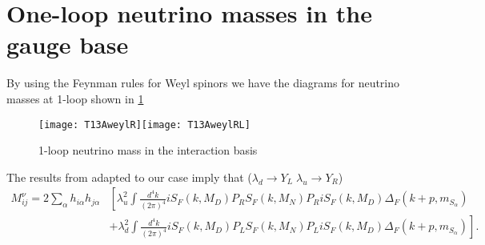 \section{One-loop neutrino masses in the gauge base}
\label{sec:mass-interaction-basis}

By using the Feynman rules for Weyl spinors we have the diagrams for
neutrino masses at 1-loop shown in \ref{fig:t13aweyl}
%
\begin{figure}[h]
  \centering
\texttt{[image: T13AweylR]}\qquad \texttt{[image: T13AweylRL]}
  \caption{1-loop neutrino mass in the interaction basis}
  \label{fig:t13aweyl}
\end{figure}

The results from \cite{Bonnet:2012kz,Suematsu:2010nd} adapted to our case imply that ($\lambda_d \to Y_L\; \lambda_u \to Y_R$)
\begin{align}
  M^{\nu}_{ij}=2\sum_{\alpha}h_{i\alpha}h_{j\alpha} &\left[  \lambda_u^2\int \frac{d^4 k}{(2\pi)^4}i S_F \left(k,M_D \right)P_R S_F \left(k,M_N \right)P_R i S_F \left(k,M_D \right)
             \Delta_F \left( k+p,m_{S_\alpha} \right)\right. \nonumber\\
          &\left.+\lambda_d^2\int \frac{d^4 k}{(2\pi)^4}i S_F \left(k,M_D \right)P_L S_F \left(k,M_N \right)P_L i S_F \left(k,M_D \right)
             \Delta_F \left( k+p,m_{S_\alpha} \right) 
            \right].
\end{align}

